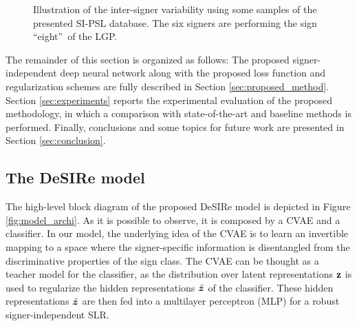 \begin{figure}[t]
\begin{minipage}[t]{0.3\columnwidth}
    \end{minipage}
    \hspace{0.00mm}
    \begin{minipage}[t]{0.3\columnwidth}
    \end{minipage}
    \caption{Illustration of the inter-signer variability using some samples of the presented SI-PSL database. The six signers are performing the sign \textquotedblleft eight\textquotedblright~of the LGP.}
    \label{fig:si_signer_variability}
\end{figure}

The remainder of this section is organized as follows: The proposed signer-independent deep neural network along with the proposed loss function and regularization schemes are fully described in Section \ref{sec:proposed_method}. Section \ref{sec:experiments} reports the experimental evaluation of the proposed methodology, in which a comparison with state-of-the-art and baseline methods is performed. Finally, conclusions and some topics for future work are presented in Section \ref{sec:conclusion}.

\subsection{The DeSIRe model}

The high-level block diagram of the proposed DeSIRe model is depicted in Figure \ref{fig:model_archi}. As it is possible to observe, it is composed by a CVAE and a classifier. In our model, the underlying idea of the CVAE is to learn an invertible mapping to a space where the signer-specific information is disentangled from the discriminative properties of the sign class. The CVAE can be thought as a teacher model for the classifier, as the distribution over latent representations ${\mathbf{z}}$ is used to regularize the hidden representations $\tilde{{\bm{z}}}$ of the classifier. These hidden representations $\tilde{{\bm{z}}}$ are then fed into a multilayer perceptron (MLP) for a robust signer-independent SLR.

